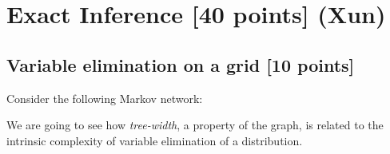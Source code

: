 \documentclass[12pt]{article}
\begin{document}
\newpage

\section{Exact Inference [40 points] (Xun)}

\subsection{Variable elimination on a grid [10 points]}

Consider the following Markov network:

\begin{figure}[h]
	\centering
\end{figure}


We are going to see how \emph{tree-width}, a property of the graph, is related to the intrinsic complexity of variable elimination of a distribution.
\end{document}
